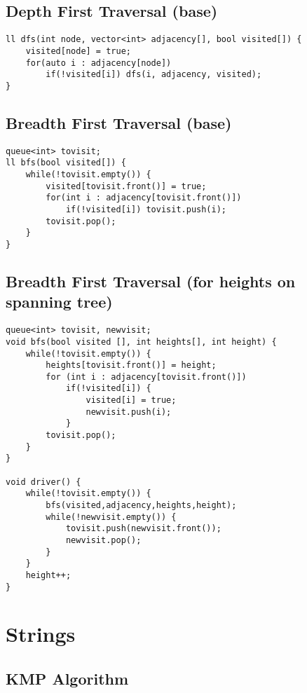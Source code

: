 \documentclass{article}
\begin{document}
\begin{multicols*}{2}
        \subsection{Depth First Traversal (base)}


        \begin{lstlisting}
ll dfs(int node, vector<int> adjacency[], bool visited[]) {
    visited[node] = true;
    for(auto i : adjacency[node])
        if(!visited[i]) dfs(i, adjacency, visited);
}       \end{lstlisting}


        \subsection{Breadth First Traversal (base)}


        \begin{lstlisting}
queue<int> tovisit;
ll bfs(bool visited[]) {
    while(!tovisit.empty()) {
        visited[tovisit.front()] = true;
        for(int i : adjacency[tovisit.front()])
            if(!visited[i]) tovisit.push(i);
        tovisit.pop();
    }
}       \end{lstlisting}
        
        \subsection{Breadth First Traversal (for heights on spanning tree)}

        
        \begin{lstlisting}
queue<int> tovisit, newvisit;
void bfs(bool visited [], int heights[], int height) {
    while(!tovisit.empty()) {
        heights[tovisit.front()] = height;
        for (int i : adjacency[tovisit.front()])
            if(!visited[i]) {
                visited[i] = true;
                newvisit.push(i);
            }
        tovisit.pop();
    }
}

void driver() {
    while(!tovisit.empty()) {
        bfs(visited,adjacency,heights,height);
        while(!newvisit.empty()) {
            tovisit.push(newvisit.front());
            newvisit.pop();
        }
    }
    height++;
}\end{lstlisting}
    \section{Strings}
        \subsection{KMP Algorithm}
        


\end{multicols*}
\end{document}
